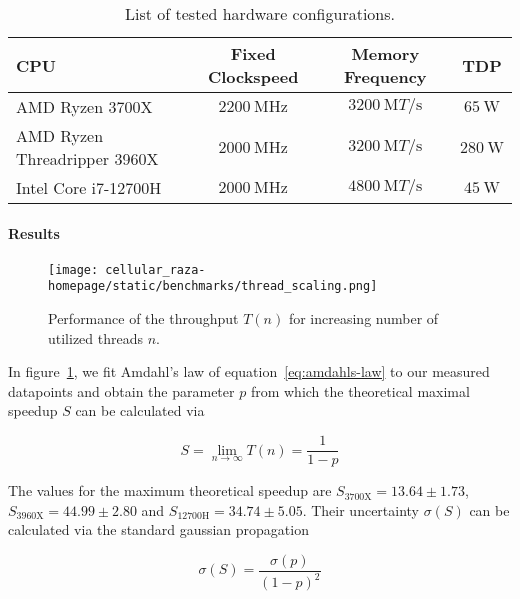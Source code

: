 \documentclass[a4paper]{article}
\begin{document}
\begin{table}
    \centering
    \begin{tabular}{l c c c}
        CPU & Fixed Clockspeed & Memory Frequency & TDP\\
        \hline
        AMD Ryzen 3700X~\cite{AMDProductSpecifications} & $\SI{2200}{\mega\hertz}$
            & $\SI{3200}{\mega T\per\second}$ & $\SI{65}{\watt}$\\
        AMD Ryzen Threadripper 3960X~\cite{AMDProductSpecifications} & $\SI{2000}{\mega\hertz}$
            & $\SI{3200}{\mega T\per\second}$ & $\SI{280}{\watt}$\\
        Intel Core i7-12700H~\cite{Inteli712700H} & $\SI{2000}{\mega\hertz}$
            & $\SI{4800}{\mega T\per\second}$
            & $\SI{45}{\watt}$\\
    \end{tabular}
    \caption{List of tested hardware configurations.}
    \label{tab:hardware-configurations}
\end{table}

\paragraph{Results}

\begin{figure}[H]
    \centering
    \texttt{[image: cellular\_raza-homepage/static/benchmarks/thread\_scaling.png]}
    \caption[Throughput performance of the cell-sorting example]
    {Performance of the throughput $T(n)$ for increasing number of utilized threads $n$.}
    \label{fig:amdahls-law-fit}
\end{figure}

In figure~\ref{fig:amdahls-law-fit}, we fit Amdahl's law of equation~\ref{eq:amdahls-law} to our
measured datapoints and obtain the parameter $p$ from which the theoretical maximal speedup $S$ can
be calculated via

\begin{equation}
    S = \lim\limits_{n\rightarrow\infty} T(n) = \frac{1}{1-p}
    \label{eq:amdahls-law-maximum-speedup}
\end{equation}

The values for the maximum theoretical speedup are $S_\text{3700X}=13.64\pm1.73$,
$S_\text{3960X}=44.99\pm2.80$ and $S_\text{12700H}=34.74\pm5.05$.
Their uncertainty $\sigma(S)$ can be calculated via the standard gaussian propagation

\begin{equation}
    \sigma(S) = \frac{\sigma(p)}{(1-p)^2}
\end{equation}
\end{document}
